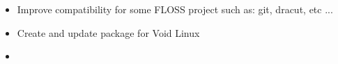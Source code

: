 \documentclass[letterpaper,11pt]{article}
\begin{document}
\begin{itemize}
  \item Improve compatibility for some FLOSS project such as: git, dracut,
    etc ...
  \item Create and update package for Void Linux
\end{itemize}

\begin{itemize}
  \item[]
\end{itemize}


\end{document}
